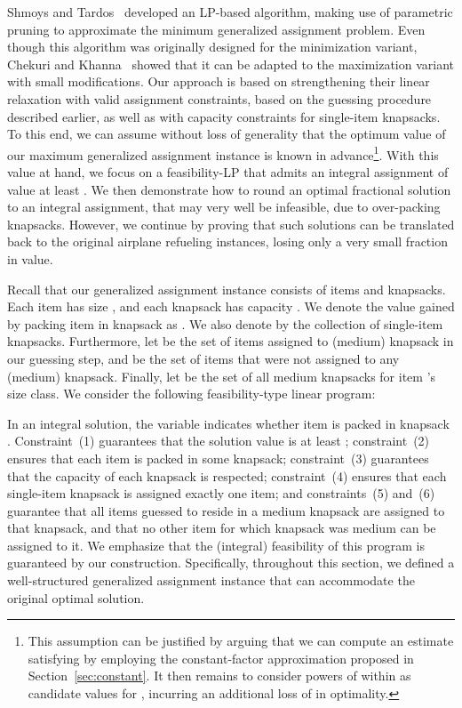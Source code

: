 \documentclass[11pt]{article}
\theoremstyle{plain}
\theoremstyle{definition}
\begin{document}
\smallskip {} Shmoys and Tardos~\cite{ShmoysT93} developed an LP-based algorithm, making use of parametric pruning to approximate the minimum generalized assignment problem. Even though this algorithm was originally designed for the minimization variant, Chekuri and Khanna~\cite{ChekuriK05} showed that it can be adapted to the maximization variant with small modifications. Our approach is based on strengthening their linear relaxation with valid assignment constraints, based on the guessing procedure described earlier, as well as with capacity constraints for single-item knapsacks. To this end, we can assume without loss of generality that the optimum value  of our maximum generalized assignment instance is known in advance\footnote{This assumption can be justified by arguing that we can compute an estimate  satisfying  by employing the constant-factor approximation proposed in Section~\ref{sec:constant}. It then remains to consider powers of  within  as candidate values for , incurring an additional loss of  in optimality.}. With this value at hand, we focus on a feasibility-LP that admits an integral assignment of value at least . We then demonstrate how to round an optimal fractional solution to an integral assignment, that may very well be infeasible, due to over-packing knapsacks. However, we continue by proving that such solutions can be translated back to the original airplane refueling instances, losing only a very small fraction in value.

\smallskip {} Recall that our generalized assignment instance consists of  items and  knapsacks. Each item  has size , and each knapsack  has capacity . We denote the value gained by packing item  in knapsack  as . We also denote by  the collection of single-item knapsacks. Furthermore, let  be the set of items assigned to (medium) knapsack  in our guessing step, and  be the set of items that were not assigned to any (medium) knapsack. Finally, let  be the set of all medium knapsacks for item 's size class. We consider the following feasibility-type linear program:


In an integral solution, the variable  indicates whether item  is packed in knapsack . Constraint~(1) guarantees that the solution value is at least ; constraint~(2) ensures that each item is packed in some knapsack; constraint~(3) guarantees that the capacity of each knapsack is respected; constraint~(4) ensures that each single-item knapsack is assigned exactly one item; and constraints~(5) and~(6) guarantee that all items guessed to reside in a medium knapsack  are assigned to that knapsack, and that no other item for which knapsack  was medium can be assigned to it. We emphasize that the (integral) feasibility of this program is guaranteed by our construction. Specifically, throughout this section, we defined a well-structured generalized assignment instance that can accommodate the original optimal solution.
\end{document}
